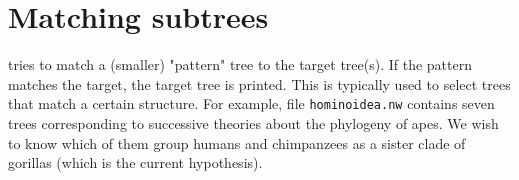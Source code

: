 \section{Matching subtrees}
\label{sct_match}

\match{} tries to match a (smaller) "pattern" tree to the target tree(s). If
the pattern matches the target, the target tree is printed. This is typically
used to select trees that match a certain structure. For example, file
\texttt{hominoidea.nw} contains seven trees corresponding to successive
theories about the phylogeny of apes. We wish to know which of them group humans and chimpanzees as a sister clade of gorillas (which is the current hypothesis).

